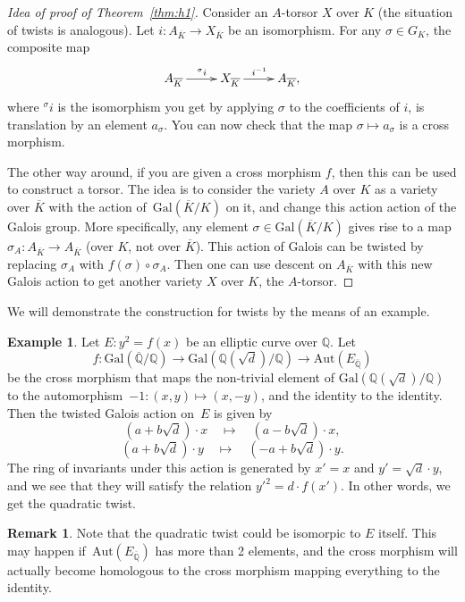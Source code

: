 \documentclass[12pt]{article}
\theoremstyle{definition}
\newtheorem{remark}[theorem]{Remark}
\newtheorem{example}[theorem]{Example}
\numberwithin{equation}{subsection}
\newcommand{\Q}{\ensuremath{\mathbb{Q}}}
\begin{document}
\begin{proof}[Idea of proof of Theorem~\ref{thm:h1}]
Consider an $A$-torsor $X$ over $K$ (the situation of twists is analogous). Let $i \colon A_{\overline{K}} \to X_{\overline{K}}$ be an isomorphism. For any $\sigma \in G_K$, the composite map
$$\xymatrix{A_{\overline{K}} \ar[r]^{{}^\sigma i} &X_{\overline{K}} \ar[r]^{i^{-1}} &A_{\overline{K}},
}$$
where ${}^\sigma i$ is the isomorphism you get by applying $\sigma$ to the coefficients of $i$, is translation by an element $a_{\sigma}$.
You can now check that the map $\sigma \mapsto a_{\sigma}$ is a cross morphism.

The other way around, if you are given a cross morphism $f$, then this can be used to construct a torsor.
The idea is to consider the variety $A$ over $K$ as a variety over $\overline{K}$ with the action of~$\mathrm{Gal}(\overline{K}/K)$ on it, and change this action action of the Galois group.
More specifically, any element $\sigma \in \mathrm{Gal}(\overline{K}/K)$ gives rise to a map $\sigma_A \colon A_{\overline{K}} \to A_{\overline{K}}$ (over $K$, not over $\overline{K}$).
This action of Galois can be twisted by replacing $\sigma_A$ with $f(\sigma) \circ \sigma_A$.
Then one can use descent on $A_{\overline{K}}$ with this new Galois action to get another variety $X$ over $K$, the $A$-torsor.
\end{proof}

We will demonstrate the construction for twists by the means of an example.

\begin{example}
Let $E \colon y^2 = f(x)$ be an elliptic curve over $\Q$. Let $$f \colon \mathrm{Gal}\!\left(\overline{\Q}/\Q\right) \to \mathrm{Gal}\!\left(\Q\left(\sqrt{d}\right)\!/\Q\right) \to \mathrm{Aut}\!\left(E_{\overline{\Q}}\right)$$ be the cross morphism that maps the non-trivial element of $\mathrm{Gal}(\Q(\sqrt{d})/\Q)$ to the automorphism~$-1 \colon (x,y) \mapsto (x, -y)$, and the identity to the identity.
Then the twisted Galois action on~$E$ is given by
$$\left(a + b\sqrt{d}\right) \cdot x \quad \mapsto \quad \left(a - b\sqrt{d}\right) \cdot x,$$
$$\left(a + b\sqrt{d}\right) \cdot y \quad \mapsto \quad \left(-a + b\sqrt{d}\right) \cdot y.$$
The ring of invariants under this action is generated by $x' = x$ and $y' = \sqrt{d}\cdot y$, and we see that they will satisfy the relation $y'^2 = d \cdot f(x')$.
In other words, we get the quadratic twist.
\end{example}

\begin{remark}
Note that the quadratic twist could be isomorpic to $E$ itself.
This may happen if~$\mathrm{Aut}(E_{\overline{\Q}})$ has more than 2 elements, and the cross morphism will actually become homologous to the cross morphism mapping everything to the identity.
\end{remark}
\end{document}
